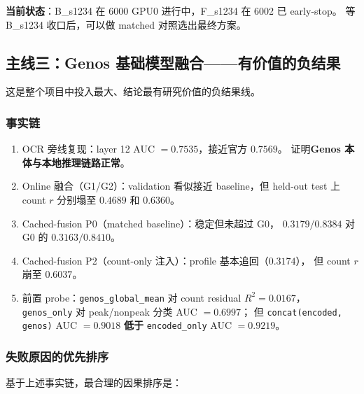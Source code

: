 \documentclass[11pt,a4paper]{ctexart}
\begin{document}
\textbf{当前状态}：B\_s1234 在 6000 GPU0 进行中，F\_s1234 在 6002 已 early-stop。
等 B\_s1234 收口后，可以做 matched 对照选出最终方案。

\subsection{主线三：Genos 基础模型融合——有价值的负结果}

这是整个项目中投入最大、结论最有研究价值的负结果线。

\subsubsection{事实链}

\begin{enumerate}[leftmargin=2em]
  \item OCR 旁线复现：layer 12 AUC $= 0.7535$，接近官方 $0.7569$。
        证明\textbf{Genos 本体与本地推理链路正常}。
  \item Online 融合（G1/G2）：validation 看似接近 baseline，但 held-out test 上
        count $r$ 分别塌至 $0.4689$ 和 $0.6360$。
  \item Cached-fusion P0（matched baseline）：稳定但未超过 G0，
        $0.3179 / 0.8384$ 对 G0 的 $0.3163 / 0.8410$。
  \item Cached-fusion P2（count-only 注入）：profile 基本追回（$0.3174$），
        但 count $r$ 崩至 $0.6037$。
  \item 前置 probe：\texttt{genos\_global\_mean} 对 count residual $R^2 = 0.0167$，
        \texttt{genos\_only} 对 peak/nonpeak 分类 AUC $= 0.6997$；
        但 \texttt{concat(encoded, genos)} AUC $= 0.9018$ \textbf{低于}
        \texttt{encoded\_only} AUC $= 0.9219$。
\end{enumerate}

\subsubsection{失败原因的优先排序}

基于上述事实链，最合理的因果排序是：
\end{document}
